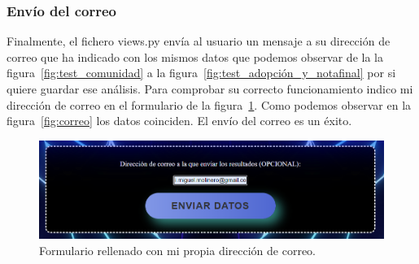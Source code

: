 \documentclass[a4paper, 12pt]{book}
\begin{document}
\subsubsection{Envío del correo}
Finalmente, el fichero views.py envía al usuario un mensaje a su dirección de correo que ha indicado con los mismos datos que podemos observar de la la figura~\ref{fig:test_comunidad} a la figura~\ref{fig:test_adopción_y_notafinal} por si quiere guardar ese análisis. Para comprobar su correcto funcionamiento indico mi dirección de correo en el formulario de la figura~\ref{fig:envio_correo}. Como podemos observar en la figura~\ref{fig:correo} los datos coinciden. El envío del correo es un éxito.
\begin{figure}
    \centering
    \includegraphics[width=1\textwidth, keepaspectratio]{img/envio_correo.png}
    \caption{Formulario rellenado con mi propia dirección de correo.}\label{fig:envio_correo}
\end{figure}
\end{document}
